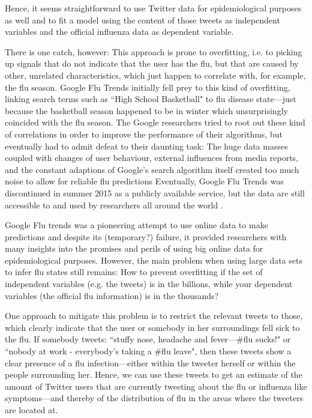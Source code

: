 \documentclass[11pt, a4paper,twoside]{report}\usepackage[]{graphicx}\usepackage[]{color}
\begin{document}
Hence, it seems straightforward to use Twitter data for epidemiological purposes as well and to fit a model using the content of those tweets as independent variables and the official influenza data as dependent variable.

There is one catch, however: This approach is prone to overfitting, i.e. to picking up signals that do not indicate that the user has the flu, but that are caused by other, unrelated characteristics, which just happen to correlate with, for example, the flu season. Google Flu Trends \citep{ginsberg_detecting_2009} initially fell prey to this kind of overfitting, linking search terms such as ``High School Basketball" to flu disease state---just because the basketball season happened to be in winter which unsurprisingly coincided with the flu season. The Google researchers tried to root out these kind of correlations in order to improve the performance of their algorithms, but eventually had to admit defeat to their daunting task: The huge data masses coupled with changes of user behaviour, external influences from media reports, and the constant adaptions of Google's search algorithm itself created too much noise to allow for reliable flu predictions \citep{olson_reassessing_2013,butler_when_2013,lazer_parable_2014} Eventually, Google Flu Trends was discontinued in summer 2015 as a publicly available service, but the data are still accessible to and used by researchers all around the world \citep{GFT_nextchapter_2015}.

Google Flu trends was a pioneering attempt to use online data to make predictions and despite its (temporary?) failure, it provided researchers with many insights into the promises and perils of using big online data for epidemiological purposes. However, the main problem when using large data sets to infer flu states still remains: How to prevent overfitting if the set of independent variables (e.g. the tweets) is in the billions, while your dependent variables (the official flu information) is in the thousands?

One approach to mitigate this problem is to restrict the relevant tweets to those, which clearly indicate that the user or somebody in her surroundings fell sick to the flu. If somebody tweets: ``stuffy nose, headache and fever---\#flu sucks!" or ``nobody at work - everybody's taking a \#flu leave", then these tweets show a clear presence of a flu infection---either within the tweeter herself or within the people surrounding her. Hence, we can use these tweets to get an estimate of the amount of Twitter users that are currently tweeting about the flu or influenza like symptoms---and thereby of the distribution of flu in the areas where the tweeters are located at.
\end{document}

